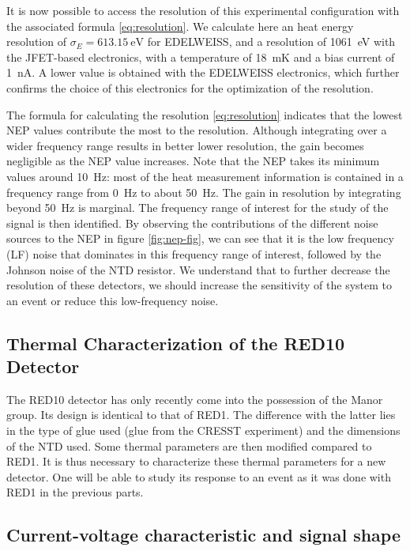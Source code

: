 It is now possible to access the resolution of this experimental configuration with the associated formula \ref{eq:resolution}. We calculate here an heat energy resolution of $\sigma_E = \SI{613.15}{\eV}$ for EDELWEISS, and a resolution of \SI{1061}{\eV} with the JFET-based electronics, with a temperature of \SI{18}{\milli\kelvin} and a bias current of \SI{1}{\nano\ampere}. A lower value is obtained with the EDELWEISS electronics, which further confirms the choice of this electronics for the optimization of the resolution.

The formula for calculating the resolution \ref{eq:resolution} indicates that the lowest NEP values contribute the most to the resolution. Although integrating over a wider frequency range results in better lower resolution, the gain becomes negligible as the NEP value increases.
Note that the NEP takes its minimum values around \SI{10}{\Hz}: most of the heat measurement information is contained in a frequency range from \SI{0}{\Hz} to about \SI{50}{Hz}. The gain in resolution by integrating beyond \SI{50}{\Hz} is marginal. The frequency range of interest for the study of the signal is then identified. By observing the contributions of the different noise sources to the NEP in figure \ref{fig:nep-fig}, we can see that it is the low frequency (LF) noise that dominates in this frequency range of interest, followed by the Johnson noise of the NTD resistor. We understand that to further decrease the resolution of these detectors, we should increase the sensitivity of the system to an event or reduce this low-frequency noise. %



\subsection{Thermal Characterization of the RED10 Detector}

The RED10 detector has only recently come into the possession of the Manor group. Its design is identical to that of RED1. The difference with the latter lies in the type of glue used (glue from the CRESST experiment) and the dimensions of the NTD used. Some thermal parameters are then modified compared to RED1. It is thus necessary to characterize these thermal parameters for a new detector. One will be able to study its response to an event as it was done with RED1 in the previous parts.

\subsection{Current-voltage characteristic and signal shape}

